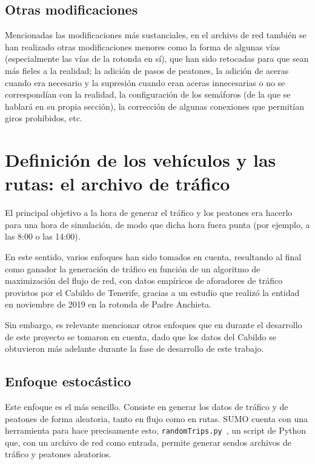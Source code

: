 \subsection{Otras modificaciones}

Mencionadas las modificaciones más sustanciales, en el archivo de red también se han realizado otras modificaciones menores como la forma de algunas vías (especialmente las vías de la rotonda en sí), que han sido retocadas para que sean más fieles a la realidad; la adición de pasos de peatones, la adición de aceras cuando era necesario y la supresión cuando eran aceras innecesarias o no se correspondían con la realidad, la configuración de los semáforos (de la que se hablará en su propia sección), la corrección de algunas conexiones que permitían giros prohibidos, etc.

\section{Definición de los vehículos y las rutas: el archivo de tráfico}

El principal objetivo a la hora de generar el tráfico y los peatones era hacerlo para una hora de simulación, de modo que dicha hora fuera punta (por ejemplo, a las 8:00 o las 14:00).

En este sentido, varios enfoques han sido tomados en cuenta, resultando al final como ganador la generación de tráfico en función de un algoritmo de maximización del flujo de red, con datos empíricos de aforadores de tráfico provistos por el Cabildo de Tenerife, gracias a un estudio que realizó la entidad en noviembre de 2019 en la rotonda de Padre Anchieta. 

Sin embargo, es relevante mencionar otros enfoques que en durante el desarrollo de este proyecto se tomaron en cuenta, dado que los datos del Cabildo se obtuvieron más adelante durante la fase de desarrollo de este trabajo.

\subsection{Enfoque estocástico}
\label{enfoque_estocastico}

Este enfoque es el más sencillo. Consiste en generar los datos de tráfico y de peatones de forma aleatoria, tanto en flujo como en rutas. SUMO cuenta con una herramienta para hace precisamente esto, \texttt{randomTrips.py}~\cite{noauthor_randomtripspy_nodate}, un script de Python que, con un archivo de red como entrada, permite generar sendos archivos de tráfico y peatones aleatorios.

